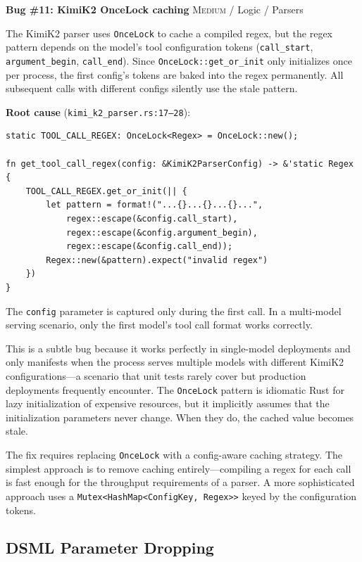 \begin{bugbox}
\textbf{Bug \#11: KimiK2 OnceLock caching} \hfill \textsc{Medium} / Logic / Parsers

The KimiK2 parser uses \texttt{OnceLock} to cache a compiled regex, but the regex pattern depends on the model's tool configuration tokens (\texttt{call\_start}, \texttt{argument\_begin}, \texttt{call\_end}). Since \texttt{OnceLock::get\_or\_init} only initializes once per process, the first config's tokens are baked into the regex permanently. All subsequent calls with different configs silently use the stale pattern.

\medskip
\textbf{Root cause} (\texttt{kimi\_k2\_parser.rs:17--28}):
\begin{verbatim}
static TOOL_CALL_REGEX: OnceLock<Regex> = OnceLock::new();

fn get_tool_call_regex(config: &KimiK2ParserConfig) -> &'static Regex {
    TOOL_CALL_REGEX.get_or_init(|| {
        let pattern = format!("...{}...{}...{}...",
            regex::escape(&config.call_start),
            regex::escape(&config.argument_begin),
            regex::escape(&config.call_end));
        Regex::new(&pattern).expect("invalid regex")
    })
}
\end{verbatim}

The \texttt{config} parameter is captured only during the first call. In a multi-model serving scenario, only the first model's tool call format works correctly.
\end{bugbox}

This is a subtle bug because it works perfectly in single-model deployments and only manifests when the process serves multiple models with different KimiK2 configurations---a scenario that unit tests rarely cover but production deployments frequently encounter. The \texttt{OnceLock} pattern is idiomatic Rust for lazy initialization of expensive resources, but it implicitly assumes that the initialization parameters never change. When they do, the cached value becomes stale.

The fix requires replacing \texttt{OnceLock} with a config-aware caching strategy. The simplest approach is to remove caching entirely---compiling a regex for each call is fast enough for the throughput requirements of a parser. A more sophisticated approach uses a \texttt{Mutex<HashMap<ConfigKey, Regex>>} keyed by the configuration tokens.

\subsection{DSML Parameter Dropping}

